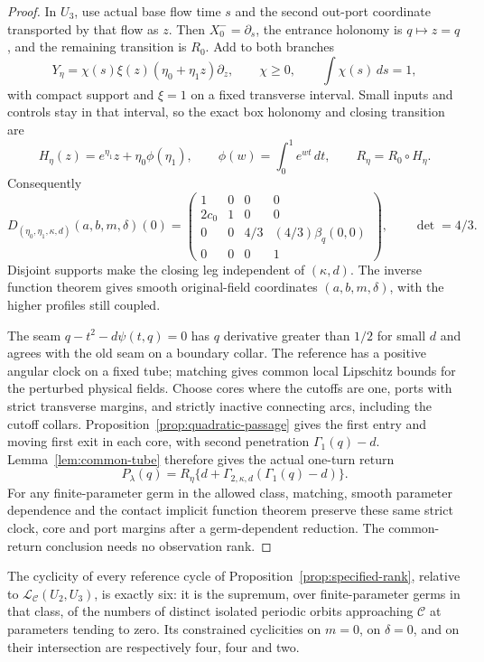 \begin{proof}
In \(U_3\), use actual base flow time \(s\) and the second out-port
coordinate transported by that flow as \(z\). Then
\(X_0^-=\partial_s\), the entrance holonomy is \(q\mapsto z=q\),
and the remaining transition is \(R_0\). Add to both branches
\[
 Y_\eta=\chi(s)\xi(z)(\eta_0+\eta_1z)\partial_z,
 \qquad \chi\ge0,\qquad \int\chi(s)\,ds=1,
\]
with compact support and \(\xi=1\) on a fixed transverse interval.
Small inputs and controls stay in that interval, so the exact box
holonomy and closing transition are
\[
 H_\eta(z)=e^{\eta_1}z+\eta_0\phi(\eta_1),\qquad
 \phi(w)=\int_0^1e^{wt}\,dt,\qquad R_\eta=R_0\circ H_\eta.
\]
Consequently
\begin{equation}\label{eq:specified-four-jacobian}
 D_{(\eta_0,\eta_1,\kappa,d)}(a,b,m,\delta)(0)=
 \begin{pmatrix}
 1&0&0&0\\2c_0&1&0&0\\
 0&0&4/3&(4/3)\beta_q(0,0)\\0&0&0&1
 \end{pmatrix},\qquad \det=4/3.
\end{equation}
Disjoint supports make the closing leg independent of \((\kappa,d)\).
The inverse function theorem gives smooth original-field coordinates
\((a,b,m,\delta)\), with the higher profiles still coupled.

The seam $q-t^2-d\psi(t,q)=0$ has $q$ derivative greater than $1/2$
for small $d$ and agrees with the old seam on a boundary collar. The
reference has a positive angular clock on a fixed tube; matching gives
common local Lipschitz bounds for the perturbed physical fields.
Choose cores where the cutoffs are one, ports with strict transverse margins,
and strictly inactive connecting arcs, including the cutoff collars.
Proposition~\ref{prop:quadratic-passage} gives the first entry and moving
first exit in each core, with second penetration $\Gamma_1(q)-d$.
Lemma~\ref{lem:common-tube} therefore gives the actual one-turn return
\[
 P_\lambda(q)=R_\eta\{d+
       \Gamma_{2,\kappa,d}(\Gamma_1(q)-d)\}.
\]
For any finite-parameter germ in the allowed class, matching, smooth
parameter dependence and the contact implicit function theorem preserve
these same strict clock, core and port margins after a germ-dependent
reduction. The common-return conclusion needs no observation rank.
\end{proof}

\begin{corollary}
\label{cor:specified-cyclicity}
The cyclicity of every reference cycle of
Proposition~\ref{prop:specified-rank}, relative to
\(\mathcal L_{\mathcal C}(U_2,U_3)\), is exactly six: it is the
supremum, over finite-parameter germs in that class, of the numbers
of distinct isolated periodic orbits approaching \(\mathcal C\)
at parameters tending to zero.
Its constrained cyclicities on $m=0$, on $\delta=0$, and on their
intersection are respectively four, four and two.
\end{corollary}

